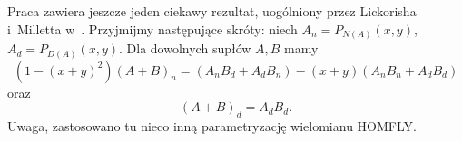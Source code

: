 \begin{tobedone}
    Praca \cite{conway70} zawiera jeszcze jeden ciekawy rezultat, uogólniony przez Lickorisha i~Milletta w~\cite{lickorish87}.
    Przyjmijmy następujące skróty: niech $A_n = P_{N(A)}(x,y)$, $A_d = P_{D(A)}(x,y)$.
    Dla dowolnych supłów $A, B$ mamy
    \[
    (1 - (x+y)^2)(A+B)_n = (A_nB_d + A_dB_n) - (x+y)(A_nB_n+  A_dB_d)
    \]
    oraz
    \[
        (A+B)_d = A_dB_d.
    \]
    Uwaga, zastosowano tu nieco inną parametryzację wielomianu HOMFLY.
\end{tobedone}




